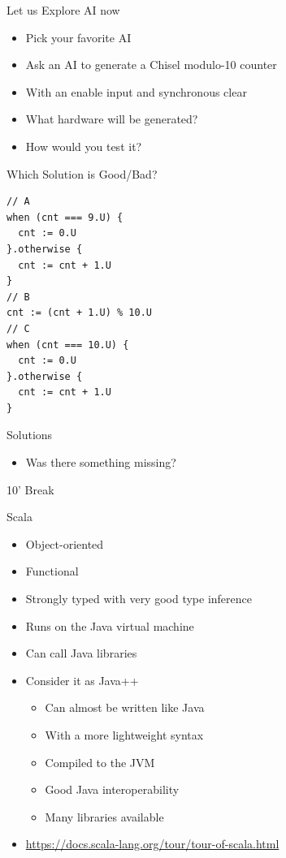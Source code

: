 \begin{frame}[fragile]{Let us Explore AI now}
\begin{itemize}
\item Pick your favorite AI
\item Ask an AI to generate a Chisel modulo-10 counter
\item With an enable input and synchronous clear
\item What hardware will be generated?
\item How would you test it?
\end{itemize}
\end{frame}

\begin{frame}[fragile]{Which Solution is Good/Bad?}
\begin{verbatim}
// A
when (cnt === 9.U) {
  cnt := 0.U
}.otherwise {
  cnt := cnt + 1.U
}
// B
cnt := (cnt + 1.U) % 10.U
// C
when (cnt === 10.U) {
  cnt := 0.U
}.otherwise {
  cnt := cnt + 1.U
}
\end{verbatim}
\end{frame}

\begin{frame}[fragile]{Solutions}
\begin{itemize}
\item Was there something missing?
\end{itemize}
\end{frame}

\begin{frame}[fragile]{10' Break}
\end{frame}

\begin{frame}[fragile]{Scala}
\begin{itemize}
\item Object-oriented
\item Functional
\item Strongly typed with very good type inference
\item Runs on the Java virtual machine
\item Can call Java libraries
\item Consider it as Java++
\begin{itemize}
\item Can almost be written like Java
\item With a more lightweight syntax
\item Compiled to the JVM
\item Good Java interoperability
\item Many libraries available
\end{itemize}
\item \url{https://docs.scala-lang.org/tour/tour-of-scala.html}
\end{itemize}
\end{frame}

